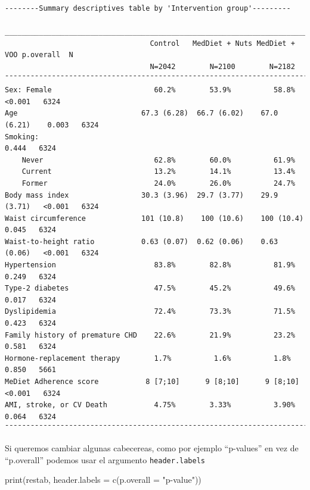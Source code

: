 \documentclass[
]{book}
\newenvironment{Shaded}{\begin{snugshade}}{\end{snugshade}}
\newcommand{\AttributeTok}[1]{\textcolor[rgb]{0.77,0.63,0.00}{#1}}
\newcommand{\FunctionTok}[1]{\textcolor[rgb]{0.00,0.00,0.00}{#1}}
\newcommand{\NormalTok}[1]{#1}
\newcommand{\StringTok}[1]{\textcolor[rgb]{0.31,0.60,0.02}{#1}}
\begin{document}
\begin{verbatim}
--------Summary descriptives table by 'Intervention group'---------

_______________________________________________________________________________________ 
                                  Control   MedDiet + Nuts MedDiet + VOO p.overall  N   
                                  N=2042        N=2100        N=2182                    
¯¯¯¯¯¯¯¯¯¯¯¯¯¯¯¯¯¯¯¯¯¯¯¯¯¯¯¯¯¯¯¯¯¯¯¯¯¯¯¯¯¯¯¯¯¯¯¯¯¯¯¯¯¯¯¯¯¯¯¯¯¯¯¯¯¯¯¯¯¯¯¯¯¯¯¯¯¯¯¯¯¯¯¯¯¯¯ 
Sex: Female                        60.2%        53.9%          58.8%      <0.001   6324 
Age                             67.3 (6.28)  66.7 (6.02)    67.0 (6.21)    0.003   6324 
Smoking:                                                                   0.444   6324 
    Never                          62.8%        60.0%          61.9%                    
    Current                        13.2%        14.1%          13.4%                    
    Former                         24.0%        26.0%          24.7%                    
Body mass index                 30.3 (3.96)  29.7 (3.77)    29.9 (3.71)   <0.001   6324 
Waist circumference             101 (10.8)    100 (10.6)    100 (10.4)     0.045   6324 
Waist-to-height ratio           0.63 (0.07)  0.62 (0.06)    0.63 (0.06)   <0.001   6324 
Hypertension                       83.8%        82.8%          81.9%       0.249   6324 
Type-2 diabetes                    47.5%        45.2%          49.6%       0.017   6324 
Dyslipidemia                       72.4%        73.3%          71.5%       0.423   6324 
Family history of premature CHD    22.6%        21.9%          23.2%       0.581   6324 
Hormone-replacement therapy        1.7%          1.6%          1.8%        0.850   5661 
MeDiet Adherence score           8 [7;10]      9 [8;10]      9 [8;10]     <0.001   6324 
AMI, stroke, or CV Death           4.75%        3.33%          3.90%       0.064   6324 
¯¯¯¯¯¯¯¯¯¯¯¯¯¯¯¯¯¯¯¯¯¯¯¯¯¯¯¯¯¯¯¯¯¯¯¯¯¯¯¯¯¯¯¯¯¯¯¯¯¯¯¯¯¯¯¯¯¯¯¯¯¯¯¯¯¯¯¯¯¯¯¯¯¯¯¯¯¯¯¯¯¯¯¯¯¯¯ 
\end{verbatim}

Si queremos cambiar algunas cabecereas, como por ejemplo ``p-values'' en vez de ``p.overall'' podemos usar el argumento \texttt{header.labels}

\begin{Shaded}
\begin{Highlighting}[]
\FunctionTok{print}\NormalTok{(restab, }\AttributeTok{header.labels =} \FunctionTok{c}\NormalTok{(}\AttributeTok{p.overall =} \StringTok{"p{-}value"}\NormalTok{))}
\end{Highlighting}
\end{Shaded}
\end{document}
